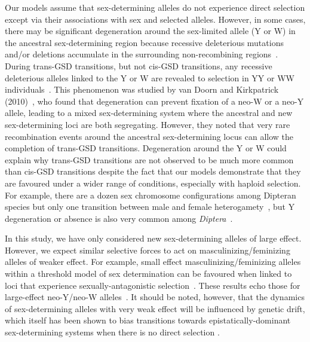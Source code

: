 \documentclass[10pt,letterpaper]{article}
\begin{document}
Our models assume that sex-determining alleles do not experience direct selection except via their associations with sex and selected alleles.
However, in some cases, there may be significant degeneration around the sex-limited allele (Y or W) in the ancestral sex-determining region because recessive deleterious mutations and/or deletions accumulate in the surrounding non-recombining regions~\cite{Rice:1996ke,Charlesworth:2000cc,Bachtrog:2006ed,Marais:2008hm}. 
During trans-GSD transitions, but not cis-GSD transitions, any recessive deleterious alleles linked to the Y or W are revealed to selection in YY or WW individuals~\cite{Bachtrog:2014bx}. 
This phenomenon was studied by van Doorn and Kirkpatrick (2010)~\cite{vanDoorn:2010hu}, who found that degeneration can prevent fixation of a neo-W or a neo-Y allele, leading to a mixed sex-determining system where the ancestral and new sex-determining loci are both segregating. 
However, they noted that very rare recombination events around the ancestral sex-determining locus can allow the completion of trans-GSD transitions.  
Degeneration around the Y or W could explain why trans-GSD transitions are not observed to be much more common than cis-GSD transitions despite the fact that our models demonstrate that they are favoured under a wider range of conditions, especially with haploid selection. 
For example, there are a dozen sex chromosome configurations among Dipteran species but only one transition between male and female heterogamety~\cite{Vicoso:2015hf}, but Y degeneration or absence is also very common among \textit{Diptera}~\cite{Vicoso:2015hf}. 

In this study, we have only considered new sex-determining alleles of large effect. 
However, we expect similar selective forces to act on masculinizing/feminizing alleles of weaker effect.
For example, small effect masculinizing/feminizing alleles within a threshold model of sex determination can be favoured when linked to loci that experience sexually-antagonistic selection~\cite{Muralidhar2018}. 
These results echo those for large-effect neo-Y/neo-W alleles~\cite{vanDoorn:2007eu,vanDoorn:2010hu}.
It should be noted, however, that the dynamics of sex-determining alleles with very weak effect will be influenced by genetic drift, which itself has been shown to bias transitions towards epistatically-dominant sex-determining systems when there is no direct selection \cite{Veller2017}.
\end{document}
